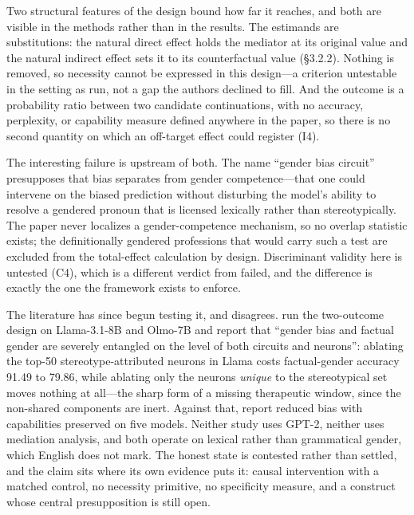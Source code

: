 \documentclass{article}
\begin{document}
Two structural features of the design bound how far it reaches, and both are visible in the methods rather than in the results. The estimands are substitutions: the natural direct effect holds the mediator at its original value and the natural indirect effect sets it to its counterfactual value (\S3.2.2). Nothing is removed, so necessity cannot be expressed in this design---a criterion untestable in the setting as run, not a gap the authors declined to fill. And the outcome is a probability ratio between two candidate continuations, with no accuracy, perplexity, or capability measure defined anywhere in the paper, so there is no second quantity on which an off-target effect could register (I4).

The interesting failure is upstream of both. The name ``gender bias circuit'' presupposes that bias separates from gender competence---that one could intervene on the biased prediction without disturbing the model's ability to resolve a gendered pronoun that is licensed lexically rather than stereotypically. The paper never localizes a gender-competence mechanism, so no overlap statistic exists; the definitionally gendered professions that would carry such a test are excluded from the total-effect calculation by design. Discriminant validity here is untested (C4), which is a different verdict from failed, and the difference is exactly the one the framework exists to enforce.

The literature has since begun testing it, and disagrees. \citet{veloso2026gknow} run the two-outcome design on Llama-3.1-8B and Olmo-7B and report that ``gender bias and factual gender are severely entangled on the level of both circuits and neurons'': ablating the top-50 stereotype-attributed neurons in Llama costs factual-gender accuracy 91.49 to 79.86, while ablating only the neurons \emph{unique} to the stereotypical set moves nothing at all---the sharp form of a missing therapeutic window, since the non-shared components are inert. Against that, \citet{yu2025gender} report reduced bias with capabilities preserved on five models. Neither study uses GPT-2, neither uses mediation analysis, and both operate on lexical rather than grammatical gender, which English does not mark. The honest state is contested rather than settled, and the claim sits where its own evidence puts it: causal intervention with a matched control, no necessity primitive, no specificity measure, and a construct whose central presupposition is still open.
\end{document}
